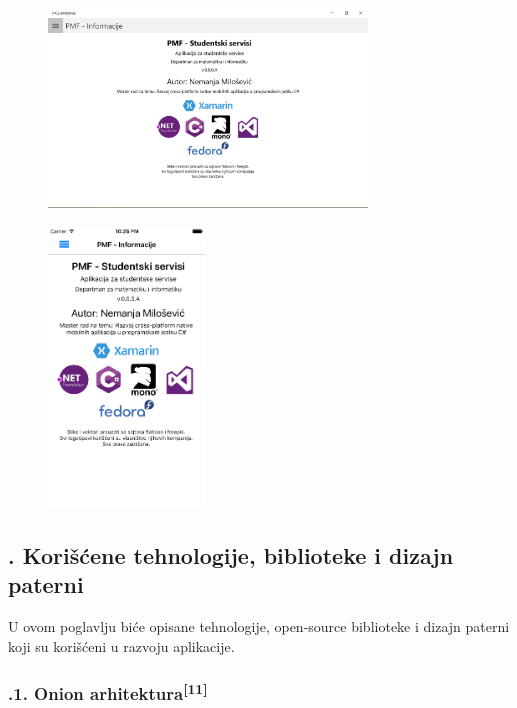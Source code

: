 \documentclass[a4paper]{article}
\begin{document}
\begin{figure}
\centering
\includegraphics[width=84.75mm,height=52.97mm]{msc-img29.png}
\end{figure}
\begin{figure}
\centering
\includegraphics[width=41.65mm,height=74.07mm]{msc-img30.png}
\end{figure}
\clearpage\subsection[7.1. Korišćene tehnologije, biblioteke i dizajn
paterni]{. Korišćene tehnologije, biblioteke i dizajn
paterni}
\hypertarget{RefHeadingToc4231813786090}{}U ovom poglavlju biće opisane
tehnologije, open-source biblioteke i dizajn paterni koji su korišćeni
u razvoju aplikacije.

\subsubsection[7.1.1. Onion arhitektura[11{]}]{.1. Onion
arhitektura\textsuperscript{[11]}}
\hypertarget{RefHeadingToc4251813786090}{}
\end{document}
